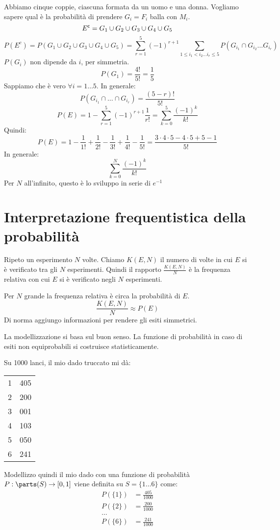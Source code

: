 \begin{exmp}
Abbiamo cinque coppie, ciascuna formata da un uomo e una donna. Vogliamo sapere qual \`e la probabilit\`a di prendere $G_i = F_i$ balla con $M_i$.
\[
E^{\mathsf{c}} = G_1 \cup G_2 \cup G_3 \cup G_4 \cup G_5
\]
\[
P(E^c) = P(G_1 \cup G_2 \cup G_3 \cup G_4 \cup G_5) = \sum_{r = 1}^{5} (-1)^{r +1} \sum_{1 \le i_1 < i_2 \dots i_r \le 5} P( G_{i_1} \cap G_{i_2} \dots G_{i_r})
\]
$P(G_i)$ non dipende da $i$, per simmetria.
\[
P(G_1) = \frac{4!}{5!} = \frac{1}{5}
\]
Sappiamo che \`e vero $\forall i = 1 \dots 5$. In generale:
\[
P( G_{i_1} \cap \dots \cap G_{i_r}) = \frac{(5 - r)!}{5!}
\]
\[
P(E) = 1 - \sum_{r = 1}^{5} (-1)^{r+1} \frac{1}{r!} = 
\sum_{k = 0}^{5} \frac{(-1)^k}{k!}
\]
Quindi:
\[
P(E) = 1 - \frac{1}{1!} + \frac{1}{2!} - \frac{1}{3!} + \frac{1}{4!} - \frac{1}{5!} = 
\frac{3 \cdot 4 \cdot 5 - 4 \cdot 5 + 5 - 1}{5!}
\]
In generale:
\[
\sum_{k = 0}^{N} \frac{(-1)^k}{k!}
\]
Per $N$ all'infinito, questo \`e lo sviluppo in serie di $e^{-1}$
\end{exmp}
\section{Interpretazione frequentistica della probabilit\`a}

Ripeto un esperimento $N$ volte. Chiamo $K(E, N)$ il numero di volte in cui $E$ si \`e verificato tra gli $N$ esperimenti. Quindi il rapporto $\frac{K(E, N)}{N}$ \`e la frequenza relativa con cui $E$ si \`e verificato negli $N$ esperimenti.

Per $N$ grande la frequenza relativa \`e circa la probabilit\`a di $E$.
\[
\frac{K(E,N)}{N} \approx P(E)
\]
Di norma aggiungo informazioni per rendere gli esiti simmetrici.

La modellizzazione si basa sul buon senso. La funzione di probabilit\`a in caso di esiti non equiprobabili si costruisce statisticamente.

Su 1000 lanci, il mio dado truccato mi d\`a:

\begin{tabular}{cc}
1 & 405 \\
2 & 200 \\
3 & 001 \\
4 & 103 \\
5 & 050 \\
6 & 241
\end{tabular}

Modellizzo quindi il mio dado con una funzione di probabilit\`a $P : \parts(S) \to [0,1]$ viene definita su $S = \{ 1 \dots 6 \}$ come:
\begin{align*}
P(\{1\}) &= \frac{405}{1000} \\
P(\{2\}) &= \frac{200}{1000} \\
\dots & \\
P(\{6\}) &= \frac{241}{1000}
\end{align*}

